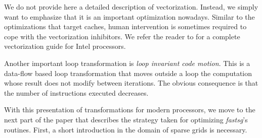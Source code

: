We do not provide here a detailed description of vectorization. Instead, we
simply want to emphasize that it is an important optimization nowadays. Similar
to the optimizations that target caches, human intervention is sometimes
required to cope with the vectorization inhibitors. We refer the reader to
\cite{vec_guide} for a complete vectorization guide for Intel processors.

Another important loop transformation is \textit{loop invariant code motion}.
This is a data-flow based loop transformation that moves outside a loop the computation
whose result does not modify between iterations. The obvious consequence is that
the number of instructions executed decreases.

With this presentation of transformations for modern processors, we move to the
next part of the paper that describes the strategy taken for optimizing
\textit{fastsg}'s routines. First, a short introduction in the domain of sparse
grids is necessary.
